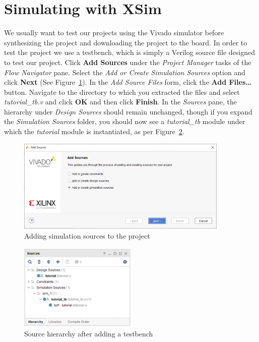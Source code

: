 \documentclass[11pt]{article}
\begin{document}
\section{Simulating with XSim}
\label{sec:simulation}
We usually want to test our projects using the Vivado simulator before synthesizing the project and downloading the project to the board. In order to test the project we use a testbench, which is simply a Verilog source file designed to test our project. Click \textbf{Add Sources} under the \textit{Project Manager} tasks of the \textit{Flow Navigator} pane. Select the \textit{Add or Create Simulation Sources} option and click \textbf{Next} (See Figure~\ref{fig:add_tb}). In the \textit{Add Source Files} form, click the \textbf{Add Files…} button. Navigate to the directory to which you extracted the files and select \textit{tutorial\_tb.v} and click \textbf{OK} and then click \textbf{Finish}. In the \textit{Sources} pane, the hierarchy under \textit{Design Sources} should remain unchanged, though if you expand the \textit{Simulation Sources} folder, you should now see a \textit{tutorial\_tb} module under which the \textit{tutorial} module is instantiated, as per Figure~\ref{fig:tb_hier}.

\begin{figure}[!h]
    \centering
    \includegraphics[width=0.9\textwidth]{images/add_tb.png}
    \caption{Adding simulation sources to the project}
    \label{fig:add_tb}
\end{figure}

\begin{figure}[!h]
    \centering
    \includegraphics[width=0.5\textwidth]{images/tb_hier.png}
    \caption{Source hierarchy after adding a testbench}
    \label{fig:tb_hier}
\end{figure}
\end{document}
